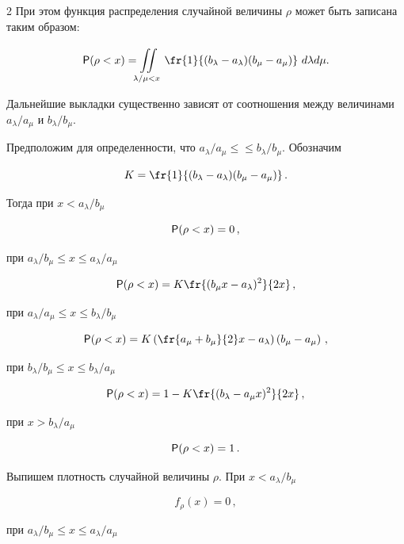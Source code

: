 \begin{multicols}{2}
При этом функция распределения случайной величины $\rho$ может быть записана таким образом:


$$\p(\rho<x)=\int\!\!\!\!\!\!\il{\!\!\!\!\lambda/\mu<x}{}\fr{1}{(b_\lambda-a_\lambda)(b_\mu-a_\mu)}\


d\lambda d\mu.$$





Дальнейшие выкладки существенно зависят от соотношения между величинами $a_\lambda/a_\mu$ и $b_\lambda/b_\mu$.


Предположим для определенности, что $a_\lambda/a_\mu\le$\linebreak $\le  b_\lambda/b_\mu$. Обозначим


$$


K=\fr{1}{(b_\lambda-a_\lambda)(b_\mu-a_\mu)}\,.


$$


Тогда при $x< a_\lambda/b_\mu$


$$


\p(\rho<x)=0\,,


$$


при $a_\lambda/b_\mu\le x\le a_\lambda/a_\mu$


$$


\p(\rho<x)=K\fr{(b_\mu x-a_\lambda)^2}{2x}\,,


$$


при $a_\lambda/a_\mu\le x\le b_\lambda/b_\mu$


$$


\p(\rho<x)=K\left(\fr{a_\mu+b_\mu}{2}x-a_\lambda\right)\left(b_\mu-a_\mu\right)\,,


$$


при $b_\lambda/b_\mu\le x\le b_\lambda/a_\mu$


$$


\p(\rho<x)=1-K\fr{(b_\lambda-a_\mu x)^2}{2x}\,,


$$


при $x>b_\lambda/a_\mu$


$$


\p(\rho<x)=1\,.


$$





Выпишем плотность случайной величины $\rho$. При $x< a_\lambda/b_\mu$


$$


f_\rho(x)=0\,,


$$


при $a_\lambda/b_\mu\le x\le a_\lambda/a_\mu$



\end{multicols}
